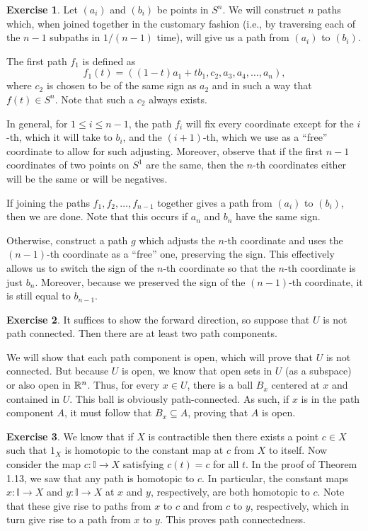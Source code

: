 \documentclass[10pt]{article}
\theoremstyle{definition}
\newtheorem{intex}{Exercise}[section]
\newenvironment{exercise}{\begin{intex}\label{\theintex}}{\end{intex}}
\newcommand*\II{\mathbb I}
\begin{document}
\begin{exercise} \leavevmode
Let $(a_i)$ and $(b_i)$ be points in $S^n$. We will construct $n$ paths which, when joined together in the customary fashion (i.e., by traversing each of the $n-1$ subpaths in $1/(n-1)$ time), will give us a path from $(a_i)$ to $(b_i)$. 

The first path $f_1$ is defined as \[f_1(t)=((1-t)a_1+tb_1,c_2,a_3,a_4,\dots,a_n),\] where $c_2$ is chosen to be of the same sign as $a_2$ and in such a way that $f(t)\in S^n$. Note that such a $c_2$ always exists. 

In general, for $1\le i\le n-1$, the path $f_i$ will fix every coordinate except for the $i$-th, which it will take to $b_i$, and the $(i+1)$-th, which we use as a ``free'' coordinate to allow for such adjusting. Moreover, observe that if the first $n-1$ coordinates of two points on $S^1$ are the same, then the $n$-th coordinates either will be the same or will be negatives. 

If joining the paths $f_1,f_2,\dots,f_{n-1}$ together gives a path from $(a_i)$ to $(b_i)$, then we are done. Note that this occurs if $a_n$ and $b_n$ have the same sign. 

Otherwise, construct a path $g$ which adjusts the $n$-th coordinate and uses the $(n-1)$-th coordinate as a ``free'' one, preserving the sign. This effectively allows us to switch the sign of the $n$-th coordinate so that the $n$-th coordinate is just $b_n$. Moreover, because we preserved the sign of the $(n-1)$-th coordinate, it is still equal to $b_{n-1}$. 
\end{exercise} 

\begin{exercise} \leavevmode
It suffices to show the forward direction, so suppose that $U$ is not path connected. Then there are at least two path components. 

We will show that each path component is open, which will prove that $U$ is not connected. But because $U$ is open, we know that open sets in $U$ (as a subspace) or also open in $\mathbb{R}^n$. Thus, for every $x\in U$, there is a ball $B_x$ centered at $x$ and contained in $U$. This ball is obviously path-connected. As such, if $x$ is in the path component $A$, it must follow that $B_x\subseteq A$, proving that $A$ is open. 
\end{exercise} 

\begin{exercise} \leavevmode
We know that if $X$ is contractible then there exists a point $c\in X$ such that $1_X$ is homotopic to the constant map at $c$ from $X$ to itself. Now consider the map $c:\II\to X$ satisfying $c(t)=c$ for all $t$. In the proof of Theorem 1.13, we saw that any path is homotopic to $c$. In particular, the constant maps $x:\II\to X$ and $y:\II\to X$ at $x$ and $y$, respectively, are both homotopic to $c$. Note that these give rise to paths from $x$ to $c$ and from $c$ to $y$, respectively, which in turn give rise to a path from $x$ to $y$. This proves path connectedness. 
\end{exercise} 
\end{document}
